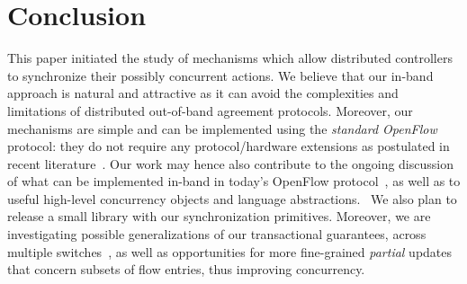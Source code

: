 \documentclass[conference]{sigcomm-alternate}
\begin{document}

\section{Conclusion}\label{sec:conclusion}

This paper initiated the study of mechanisms which allow distributed controllers
to synchronize their possibly concurrent actions. We believe that our in-band
approach is natural and attractive as it can avoid the
complexities and limitations of distributed out-of-band agreement protocols.
Moreover, our mechanisms are simple and can be implemented using the \emph{standard OpenFlow}
protocol: they do not require any protocol/hardware extensions as postulated in recent literature~\cite{stn,netpaxos}.
Our work may hence also contribute to the ongoing discussion of what can be implemented
in-band in today's OpenFlow protocol~\cite{reclaim},
as well as to useful high-level concurrency objects and
language abstractions.~\cite{pyretic}
We also plan to release a small library with our synchronization primitives. 
Moreover, we are investigating possible generalizations of our transactional guarantees,
across multiple switches~\cite{stn}, as well as opportunities for more fine-grained
\emph{partial} updates that concern subsets of flow entries, thus improving concurrency. 

%
\end{document}
